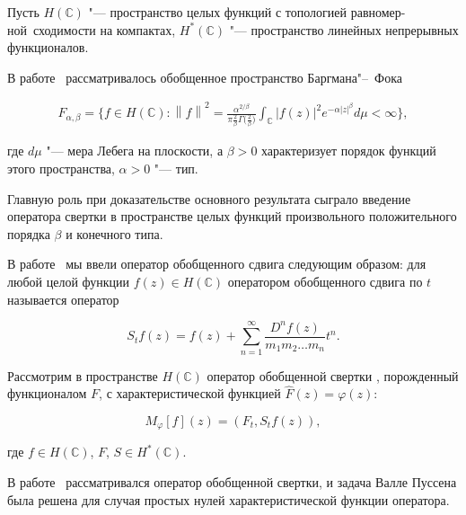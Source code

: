 Пусть $H(\mathbb{C})$ "--- пространство целых функций с топологией равномер- \linebreak ной~сходимости на компактах, $H^*(\mathbb{C})$ "--- пространство линейных непрерывных функционалов.



В работе~\cite{napal:bib11} рассматривалось обобщенное пространство Баргмана"--~Фока

 \begin{eqnarray*}

 F_{\alpha, \beta}=\biggl\{f\in H(\mathbb{C}):\left\|f\right\|^2=\frac{\alpha^{{2}/{\beta}}}{\pi\frac{2}{\beta}\Gamma\bigl(\frac{2}{\beta} \bigr)}\int _\mathbb{C}  |f(z)|^2e^{-\alpha |z|^\beta } d\mu< \infty\biggr\},

\end{eqnarray*}

где $ d\mu$ "--- мера Лебега на плоскости, а $\beta > 0$ характеризует порядок функций этого пространства, $\alpha > 0$ "--- тип.



    Главную роль при доказательстве основного результата сыграло введение оператора свертки в пространстве целых функций произвольного положительного порядка $\beta$ и конечного типа.



  В работе~\cite{napal:bib11} мы ввели оператор обобщенного сдвига следующим образом: для любой целой функции $f(z)\in H(\mathbb{C})$ оператором обобщенного сдвига по $t$ называется оператор

$$

S_t f(z)=f(z) + \sum\limits_{n=1}^{\infty}\frac{D^n f(z)}{m_1 m_2 \ldots m_n} t^{n}.

$$



    Рассмотрим в пространстве $H(\mathbb{C})$ оператор обобщенной свертки \cite[c.~206]{napal:bib11}, порожденный функционалом $F$, с характеристической функцией $\widehat{F}(z)=\varphi(z)$:

$$

M_\varphi [f](z)=(F_t, S_t f(z)),

$$

 где $f\in H(\mathbb{C})$, $F$, $S \in H^*(\mathbb{C})$.



 В работе~\cite{napal:bib11} рассматривался оператор обобщенной свертки, и задача Валле Пуссена была решена для случая простых нулей характеристической функции оператора.



